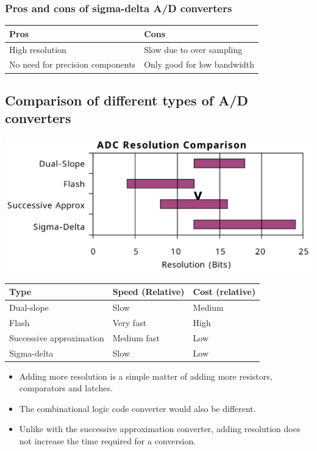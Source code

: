 \documentclass[11pt]{article}
\begin{document}
\subsubsection{Pros and cons of sigma-delta A/D converters}
\label{sec:org9c703b3}
\begin{center}
\begin{tabular}{l|l}
Pros & Cons\\
\hline
High resolution & Slow due to over sampling\\
No need for precision components & Only good for low bandwidth\\
\end{tabular}
\end{center}
\subsection{Comparison of different types of A/D converters}
\label{sec:orge19c1e6}
\begin{center}
\includegraphics[width=.9\linewidth]{./images/adc-converter-comparison-graph.png}
\end{center}

\begin{center}
\begin{tabular}{l|l|l}
Type & Speed (Relative) & Cost (relative)\\
\hline
Dual-slope & Slow & Medium\\
Flash & Very fast & High\\
Successive approximation & Medium fast & Low\\
Sigma-delta & Slow & Low\\
\end{tabular}
\end{center}

\begin{itemize}
\item Adding more resolution is a simple matter of adding more resistors, comparators and latches.
\item The combinational logic code converter would also be different.
\item Unlike with the successive approximation converter, adding resolution does not increase the time required for a conversion.
\end{itemize}
\end{document}
